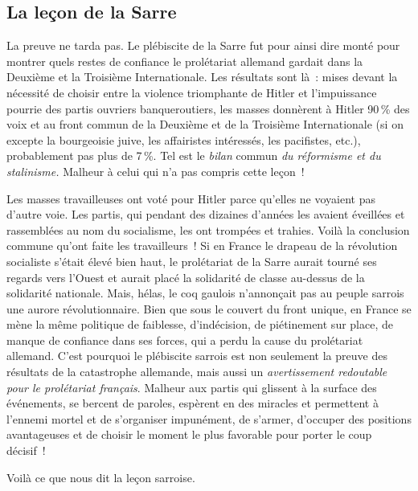 \documentclass[french,twoside]{book} %
\begin{document}
\subsection[{La leçon de la Sarre}]{La leçon de la Sarre}
\noindent La preuve ne tarda pas. Le plébiscite de la Sarre fut pour ainsi dire monté pour montrer quels restes de confiance le prolétariat allemand gardait dans la Deuxième et la Troisième Internationale. Les résultats sont là : mises devant la nécessité de choisir entre la violence triomphante de Hitler et l’impuissance pourrie des partis ouvriers  banqueroutiers, les masses donnèrent à Hitler 90 \% des voix et au front commun de la Deuxième et de la Troisième Internationale (si on excepte la bourgeoisie juive, les affairistes intéressés, les pacifistes, etc.), probablement pas plus de 7 \%. Tel est le \emph{bilan} commun \emph{du réformisme et du stalinisme.} Malheur à celui qui n’a pas compris cette leçon !\par
Les masses travailleuses ont voté pour Hitler parce qu’elles ne voyaient pas d’autre voie. Les partis, qui pendant des dizaines d’années les avaient éveillées et rassemblées au nom du socialisme, les ont trompées et trahies. Voilà la conclusion commune qu’ont faite les travailleurs ! Si en France le drapeau de la révolution socialiste s’était élevé bien haut, le prolétariat de la Sarre aurait tourné ses regards vers l’Ouest et aurait placé la solidarité de classe au-dessus de la solidarité nationale. Mais, hélas, le coq gaulois n’annonçait pas au peuple sarrois une aurore révolutionnaire. Bien que sous le couvert du front unique, en France se mène la même politique de faiblesse, d’indécision, de piétinement sur place, de manque de confiance dans ses forces, qui a perdu la cause du prolétariat allemand. C’est pourquoi le plébiscite sarrois est non seulement la preuve des résultats de la catastrophe allemande, mais aussi un \emph{avertissement redoutable pour le prolétariat français}. Malheur aux partis qui glissent à la surface des événements, se bercent de paroles, espèrent en des miracles et permettent à l’ennemi mortel et de s’organiser impunément, de s’armer, d’occuper des positions avantageuses et de choisir le moment le plus favorable pour porter le coup décisif !\par
Voilà ce que nous dit la leçon sarroise.
\end{document}
